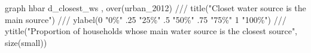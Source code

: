 graph hbar d_closest_ws , over(urban_2012) ///
        title("Closet water source is the main source") ///
        ylabel(0 "0\%" .25 "25\%" .5 "50\%" .75 "75\%" 1 "100\%") ///
        ytitle("Proportion of households whose main water source is the closest source", size(small))
